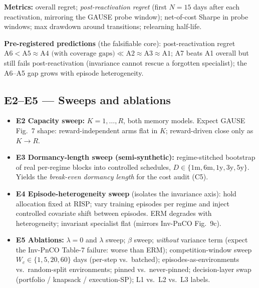 \documentclass[11pt]{article}
\newcommand{\risp}{\textsc{RISP}}
\begin{document}
\noindent\textbf{Metrics:} overall regret; \emph{post-reactivation regret} (first $N{=}15$ days after each reactivation, mirroring the GAUSE probe window); net-of-cost Sharpe in probe windows; max drawdown around transitions; relearning half-life.

\medskip\noindent\textbf{Pre-registered predictions} (the falsifiable core): post-reactivation regret
$\text{A6} < \text{A5} \approx \text{A4 (with coverage gaps)} \ll \text{A2} \approx \text{A3} \approx \text{A1}$; A7 beats A1 overall but still fails post-reactivation (invariance cannot rescue a forgotten specialist); the A6--A5 gap grows with episode heterogeneity.

\subsection{E2--E5 --- Sweeps and ablations}
\begin{itemize}
  \item \textbf{E2 Capacity sweep:} $K=1,\dots,R$, both memory models. Expect GAUSE Fig.~7 shape: reward-independent arms flat in $K$; reward-driven close only as $K\to R$.
  \item \textbf{E3 Dormancy-length sweep (semi-synthetic):} regime-stitched bootstrap of real per-regime blocks into controlled schedules, $D\in\{1\text{m},6\text{m},1\text{y},3\text{y},5\text{y}\}$. Yields the \emph{break-even dormancy length} for the cost audit (C5).
  \item \textbf{E4 Episode-heterogeneity sweep} (isolates the invariance axis): hold allocation fixed at \risp; vary training episodes per regime and inject controlled covariate shift between episodes. ERM degrades with heterogeneity; invariant specialist flat (mirrors Inv-PnCO Fig.~9c).
  \item \textbf{E5 Ablations:} $\lambda=0$ and $\lambda$ sweep; $\beta$ sweep; \emph{without} variance term (expect the Inv-PnCO Table-7 failure: worse than ERM); competition-window sweep $W_c\in\{1,5,20,60\}$ days (per-step vs.\ batched); episodes-as-environments vs.\ random-split environments; pinned vs.\ never-pinned; decision-layer swap (portfolio / knapsack / execution-SP); L1 vs.\ L2 vs.\ L3 labels.
\end{itemize}
\end{document}
